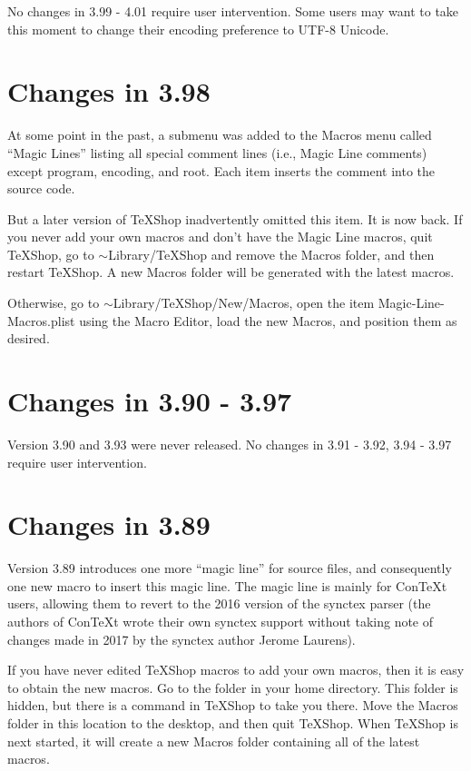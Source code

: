 \documentclass[11pt, oneside]{amsart}
\begin{document}
No changes in 3.99 - 4.01 require user intervention. Some users may want to take this moment to change their encoding preference to UTF-8 Unicode.

\section{Changes in 3.98}

At some point in the past, a submenu was added to the Macros menu called ``Magic Lines'' listing all special comment lines (i.e., Magic Line comments) except program, encoding, and root. Each item inserts the comment into the source code.

But a later version of TeXShop inadvertently omitted this item. It is now back. If you never add your own macros and don't have the Magic Line macros, quit TeXShop, go to $\sim$Library/TeXShop and remove the Macros folder, and then restart TeXShop. A new Macros folder will be generated with the latest macros.

Otherwise, go to $\sim$Library/TeXShop/New/Macros, open the item Magic-Line-Macros.plist using the Macro Editor, load the new Macros, and position them as desired.



\section{Changes in 3.90 - 3.97}

Version 3.90 and 3.93 were never released. No changes in 3.91 - 3.92, 3.94 - 3.97 require user intervention.


\section{Changes in 3.89}

Version 3.89 introduces one more ``magic line'' for source files, and consequently one new macro to insert this magic line. The magic line is mainly for ConTeXt users, allowing them to revert to the 2016 version of the synctex parser (the authors of ConTeXt wrote their own synctex support without taking note of changes made in 2017 by the synctex author Jerome Laurens). 

If you have never edited TeXShop macros to add your own macros, then it is easy to obtain the new macros.
Go to the  folder  in your home directory. This folder is hidden, but there is a command in TeXShop to take you there. Move the Macros folder in this location to the desktop,
and then quit TeXShop. When TeXShop is next started, it will create a new Macros folder containing all of the latest macros.
\end{document}
